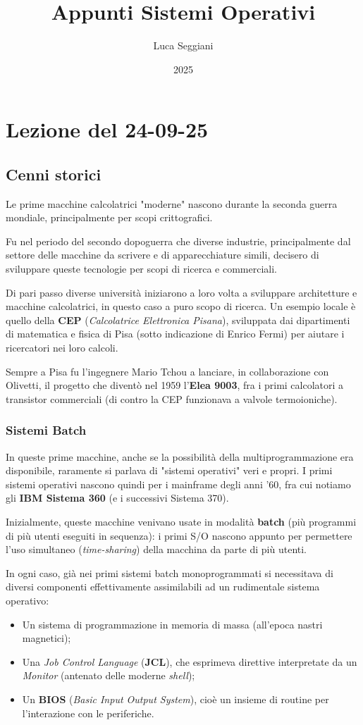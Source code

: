 \documentclass[a4paper,11pt]{article}
\title{Appunti Sistemi Operativi}
\author{Luca Seggiani}
\date{2025}
\begin{document}
\section{Lezione del 24-09-25}

\thispagestyle{empty}
\pagestyle{fancy}

\subsection{Cenni storici}
Le prime macchine calcolatrici "moderne" nascono durante la seconda guerra mondiale, principalmente per scopi crittografici.

Fu nel periodo del secondo dopoguerra che diverse industrie, principalmente dal settore delle macchine da scrivere e di apparecchiature simili, decisero di sviluppare queste tecnologie per scopi di ricerca e commerciali.

Di pari passo diverse università iniziarono a loro volta a sviluppare architetture e macchine calcolatrici, in questo caso a puro scopo di ricerca. 
Un esempio locale è quello della \textbf{CEP} (\textit{Calcolatrice Elettronica Pisana}), sviluppata dai dipartimenti di matematica e fisica di Pisa (sotto indicazione di Enrico Fermi) per aiutare i ricercatori nei loro calcoli. 

Sempre a Pisa fu l'ingegnere Mario Tchou a lanciare, in collaborazione con Olivetti, il progetto che diventò nel 1959 l'\textbf{Elea 9003}, fra i primi calcolatori a transistor commerciali (di contro la CEP funzionava a valvole termoioniche).

\subsubsection{Sistemi Batch}
In queste prime macchine, anche se la possibilità della multiprogrammazione era disponibile, raramente si parlava di "sistemi operativi" veri e propri.
I primi sistemi operativi nascono quindi per i mainframe degli anni '60, fra cui notiamo gli \textbf{IBM Sistema 360} (e i successivi Sistema 370).

Inizialmente, queste macchine venivano usate in modalità \textbf{batch} (più programmi di più utenti eseguiti in sequenza): i primi S/O nascono appunto per permettere l'uso simultaneo (\textit{time-sharing}) della macchina da parte di più utenti.

In ogni caso, già nei primi sistemi batch monoprogrammati si necessitava di diversi componenti effettivamente assimilabili ad un rudimentale sistema operativo:
\begin{itemize}
	\item Un sistema di programmazione in memoria di massa (all'epoca nastri magnetici);
	\item Una \textit{Job Control Language} (\textbf{JCL}), che esprimeva direttive interpretate da un \textit{Monitor} (antenato delle moderne \textit{shell});
	\item Un \textbf{BIOS} (\textit{Basic Input Output System}), cioè un insieme di routine per l'interazione con le periferiche.
\end{itemize}
\end{document}
